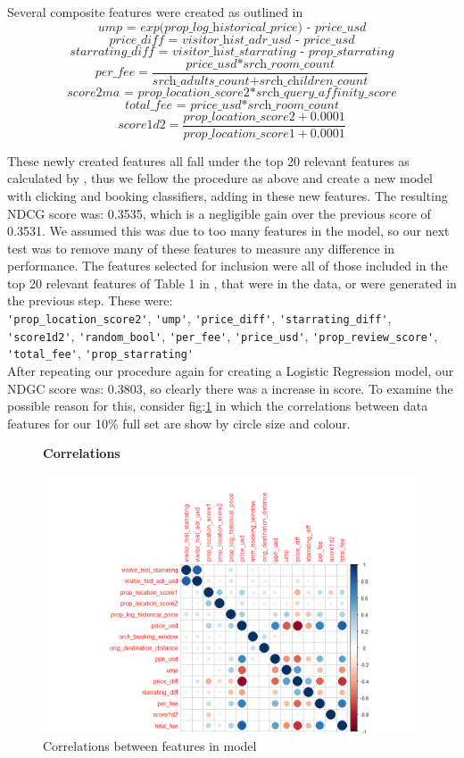 \documentclass{llncs}
\begin{document}
Several composite features were created as outlined in \cite{DBLP:journals/corr/LiuXZYPLSW13}
\[\textit{ump = exp(prop\_ log\_ historical\_ price) - price\_ usd}\]
\[\textit{price\_ diff = visitor\_ hist\_ adr\_ usd - price\_ usd}\]
\[\textit{starrating\_ diff = visitor\_ hist\_ starrating - prop\_ starrating}\]
\[\textit{per\_ fee} = \frac{\textit{price\_ usd*srch\_ room\_ count}}{\textit{srch\_ adults\_ count+srch\_ children\_ count}}\]
\[\textit{score2ma = prop\_ location\_ score2*srch\_ query\_ affinity\_ score}\]
\[\textit{total\_ fee = price\_ usd*srch\_ room\_ count}\]
\[\textit{score1d2} = \frac{\textit{prop\_ location\_ score2} + 0.0001}{\textit{prop\_ location\_ score1} + 0.0001}\]

These newly created features all fall under the top 20 relevant features as calculated by \cite{DBLP:journals/corr/LiuXZYPLSW13}, thus we fellow the procedure as above and create a new model with clicking and booking classifiers, adding in these new features. The resulting NDCG score was: 0.3535, which is a negligible gain over the previous score of 0.3531. We assumed this was due to too many features in the model, so our next test was to remove many of these features to measure any difference in performance. The features selected for inclusion were all of those included in the top 20 relevant features of Table 1 in \cite{DBLP:journals/corr/LiuXZYPLSW13}, that were in the data, or were generated in the previous step. These were:\\ \verb!'prop_location_score2'!, \verb!'ump'!, \verb!'price_diff'!, \verb!'starrating_diff'!, \verb!'score1d2'!, \verb!'random_bool'!, \verb!'per_fee'!, \verb!'price_usd'!, \verb!'prop_review_score'!, \verb!'total_fee'!, \verb!'prop_starrating'!
\\
After repeating our procedure again for creating a Logistic Regression model, our NDGC score was: 0.3803, so clearly there was a increase in score. To examine the possible reason for this, consider fig:\ref{fig:corr} in which the correlations between data features for our 10\% full set are show by circle size and colour.

	\begin{figure}[H]
	\centering
	\textbf{Correlations}\par\medskip
		\includegraphics[scale=0.3]{figures/corr_plot.png}
	\caption{Correlations between features in model}
	\label{fig:corr}
	\end{figure}
\end{document}
